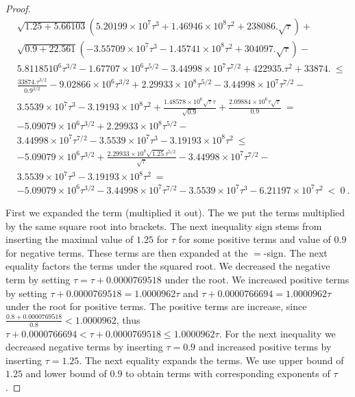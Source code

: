 \documentclass{article}
\renewcommand{\leq}{\leqslant}
\begin{document}
\begin{proof}
\begin{align}
&\sqrt{1.25 +5.66103} \left(5.20199\times 10^7 \tau^3+1.46946\times 10^8 \tau^2+238086. \sqrt{\tau}\right)+\\ \nonumber 
&\sqrt{0.9 +22.561} \left(-3.55709\times 10^7 \tau^3-1.45741\times 10^8 \tau^2+304097. \sqrt{\tau}\right)-\\ \nonumber 
&5.81185 10^6 \tau^{3/2}-1.67707\times 10^6 \tau^{5/2}-3.44998\times 10^7 \tau^{7/2}+422935. \tau^2+33874. \ \leq \\ \nonumber 
&
\frac{33874. \tau^{3/2}}{0.9^{3/2}}-9.02866\times 10^6 \tau^{3/2}+2.29933\times 10^8 \tau^{5/2}-3.44998\times 10^7 \tau^{7/2}-\\ \nonumber 
&3.5539\times 10^7 \tau^3-3.19193\times 10^8 \tau^2+\frac{1.48578\times 10^6 \sqrt{\tau} \tau}{\sqrt{0.9}}+\frac{2.09884\times 10^6 \tau \sqrt{\tau}}{0.9}\ = \\ \nonumber 
&
-5.09079\times 10^6 \tau^{3/2}+2.29933\times 10^8 \tau^{5/2}-\\ \nonumber 
&3.44998\times 10^7 \tau^{7/2}-3.5539\times 10^7 \tau^3-3.19193\times 10^8 \tau^2 \ \leq \\ \nonumber 
&
-5.09079\times 10^6 \tau^{3/2}+\frac{2.29933\times 10^8 \sqrt{1.25} \tau^{5/2}}{\sqrt{\tau}}-3.44998\times 10^7 \tau^{7/2}-\\ \nonumber 
&3.5539\times 10^7 \tau^3-3.19193\times 10^8 \tau^2\ = \\ \nonumber &
-5.09079\times 10^6 \tau^{3/2}-3.44998\times 10^7 \tau^{7/2}-3.5539\times 10^7 \tau^3-6.21197\times 10^7 \tau^2\ < \ 0 \ . 
\end{align}

First we expanded the term (multiplied it out).
The we put the terms multiplied by the same square root into brackets.
The next inequality sign stems from inserting the maximal value of $1.25$ for $\tau$ for
some positive terms and value of $0.9$ for negative terms. 
These terms are then expanded at the $=$-sign.
The next equality factors the terms under the squared root.
We decreased the negative term by setting
$\tau=\tau+0.0000769518$ under the root.
We increased positive terms by setting  
$\tau+0.0000769518=1.0000962\tau$ and
$\tau+0.0000766694 =1.0000962\tau$
under the root for positive terms.
The positive terms are increase, since
$\frac{0.8 + 0.0000769518}{0.8}<1.0000962$, thus
$\tau+0.0000766694<\tau+0.0000769518 \leq
1.0000962\tau$.
For the next inequality we decreased negative terms by inserting
$\tau=0.9$ and increased positive terms by inserting
$\tau=1.25$. The next equality expands the terms.
We use upper bound of $1.25$ and lower bound of $0.9$ to obtain terms with
corresponding exponents of $\tau$.


\end{proof}
\end{document}
